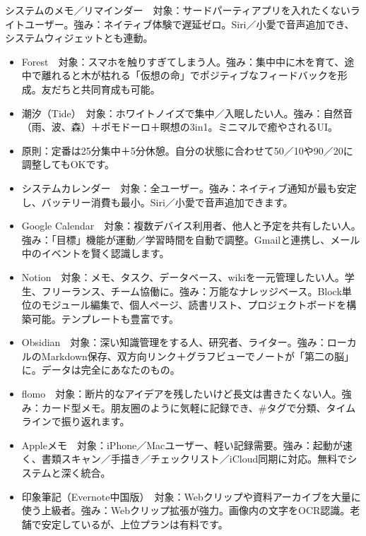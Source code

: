 システムのメモ／リマインダー　対象：サードパーティアプリを入れたくないライトユーザー。強み：ネイティブ体験で遅延ゼロ。Siri／小愛で音声追加でき、システムウィジェットとも連動。


\begin{itemize}
  \item Forest　対象：スマホを触りすぎてしまう人。強み：集中中に木を育て、途中で離れると木が枯れる「仮想の命」でポジティブなフィードバックを形成。友だちと共同育成も可能。
  \item 潮汐（Tide）　対象：ホワイトノイズで集中／入眠したい人。強み：自然音（雨、波、森）＋ポモドーロ＋瞑想の3in1。ミニマルで癒やされるUI。
  \item 原則：定番は25分集中＋5分休憩。自分の状態に合わせて50／10や90／20に調整してもOKです。
\end{itemize}


\begin{itemize}
  \item システムカレンダー　対象：全ユーザー。強み：ネイティブ通知が最も安定し、バッテリー消費も最小。Siri／小愛で音声追加できます。
  \item Google Calendar　対象：複数デバイス利用者、他人と予定を共有したい人。強み：「目標」機能が運動／学習時間を自動で調整。Gmailと連携し、メール中のイベントを賢く認識します。
\end{itemize}


\begin{itemize}
  \item Notion　対象：メモ、タスク、データベース、wikiを一元管理したい人。学生、フリーランス、チーム協働に。強み：万能なナレッジベース。Block単位のモジュール編集で、個人ページ、読書リスト、プロジェクトボードを構築可能。テンプレートも豊富です。
  \item Obsidian　対象：深い知識管理をする人、研究者、ライター。強み：ローカルのMarkdown保存、双方向リンク＋グラフビューでノートが「第二の脳」に。データは完全にあなたのもの。
  \item flomo　対象：断片的なアイデアを残したいけど長文は書きたくない人。強み：カード型メモ。朋友圈のように気軽に記録でき、\#タグで分類、タイムラインで振り返れます。
  \item Appleメモ　対象：iPhone／Macユーザー、軽い記録需要。強み：起動が速く、書類スキャン／手描き／チェックリスト／iCloud同期に対応。無料でシステムと深く統合。
  \item 印象筆記（Evernote中国版）　対象：Webクリップや資料アーカイブを大量に使う上級者。強み：Webクリップ拡張が強力。画像内の文字をOCR認識。老舗で安定しているが、上位プランは有料です。
\end{itemize}

